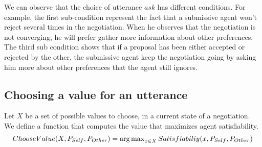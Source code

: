 \documentclass{article}
\begin{document}
	We can observe that the choice of utterance $ask$ has different conditions. For example, the first sub-condition represent the fact that a submissive agent won't reject several times in the negotiation. When he observes that the negotiation is not converging, he will prefer gather more information about other preferences. The third sub condition shows that if a proposal has been either accepted or rejected by the other, the submissive agent keep the negotiation going by asking him more about other preferences that the agent still ignores. 
	\subsection{Choosing a value for an utterance}
	Let $X$ be a set of possible values to choose, in a current state of a negotiation. We define a function that computes the value that maximizes agent satisfiability.  
	\begin{dmath}
		$$ ChooseValue(X,P_{Self},P_{Other}) = \operatorname*{arg\,max}_{x \in X} Satisfiabiliy(x,P_{Self},P_{Other})$$ 
	\end{dmath}
	
%	
%	
%	
	
\end{document}
